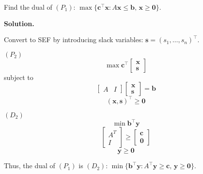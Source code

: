 \begin{exbox}
    \begin{example}[Dual]
        Find the dual of
$ (P_1)$: $\max \{\bm{c}^\top \bm{x}: A \bm{x}\leqslant \bm{b},\,\bm{x}\geqslant  \bm{0}\}$.

\textbf{Solution.}

Convert to SEF by introducing slack variables: $ \bm{s}=(s_1,\ldots,s_n)^\top $.

$ (P_2) $
\[ \max \bm{c}^\top
\begin{bmatrix}
    \bm{x}\\
    \bm{s}
\end{bmatrix} \]
subject to
\[ \left[ \begin{array}{c|c}
    A & I
\end{array} \right]
\begin{bmatrix}
    \bm{x}\\
    \bm{s}
\end{bmatrix} = \bm{b} \]
\[ (\bm{x},\bm{s})^\top\geqslant  \bm{0} \]

$ (D_2) $
\[ \min \bm{b}^\top \bm{y} \]
\[ \begin{bmatrix}
    A^T\\
    I
\end{bmatrix} \geqslant 
\begin{bmatrix}
    \bm{c}\\
    \bm{0}
\end{bmatrix}\]
\[ \bm{y}\geqslant  \bm{0} \]

Thus, the dual of $ (P_1) $ is $ (D_2) $: 
$\min\{\bm{b}^\top \bm{y}: A ^\top \bm{y}\geqslant  \bm{c},\,\bm{y}\geqslant  \bm{0}\}$.

    \end{example}
\end{exbox}